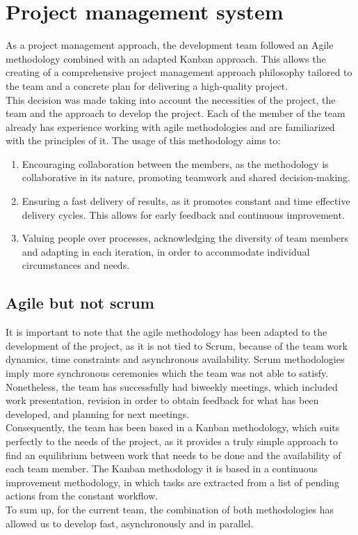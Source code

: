 \documentclass[../memory.tex]{subfiles}
\begin{document}
\section{Project management system}
As a project management approach, the development team followed an Agile
methodology combined with an adapted Kanban approach. This allows the creating
of a comprehensive project management approach philosophy tailored to the team
and a concrete plan for delivering a high-quality project.
\\
This decision was made taking into account the necessities of the project, the
team and the approach to develop the project. Each of the member of the team
already has experience working with agile methodologies and are familiarized
with the principles of it. The usage of this methodology aims to:
\begin{enumerate}
	\item Encouraging collaboration between the members, as the methodology is
	      collaborative in its nature, promoting teamwork and shared decision-making.
	\item Ensuring a fast delivery of results, as it promotes constant and time
	      effective delivery cycles. This allows for early feedback and continuous
	      improvement.
	\item Valuing people over processes, acknowledging the diversity of team
	      members and adapting in each iteration, in order to accommodate individual
	      circumstances and needs.
\end{enumerate}
\subsection{Agile but not scrum}
It is important to note that the agile methodology has been adapted to the
development of the project, as it is not tied to Scrum, because of the team work
dynamics, time constraints and asynchronous availability. Scrum methodologies
imply more synchronous ceremonies which the team was not able to satisfy.
Nonetheless, the team has successfully had biweekly meetings, which included
work presentation, revision in order to obtain feedback for what has been
developed, and planning for next meetings.
\\[8pt]
Consequently, the team has been based in a Kanban methodology, which suits
perfectly to the needs of the project, as it provides a truly simple approach to
find an equilibrium between work that needs to be done and the availability of
each team member. The Kanban methodology it is based in a continuous improvement
methodology, in which tasks are extracted from a list of pending actions from
the constant workflow.
\\[8pt]
To sum up, for the current team, the combination of both methodologies has
allowed us to develop fast, asynchronously and in parallel.
\end{document}
